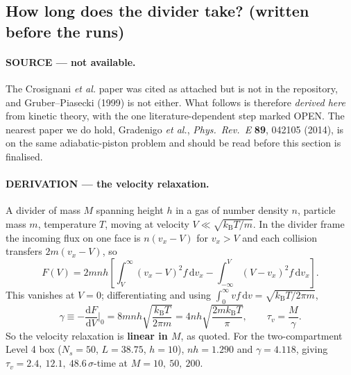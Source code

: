 \documentclass[11pt,a4paper]{article}
\newcommand{\kT}{k_{\mathrm B}T}
\newcommand{\dd}{\mathrm{d}}
\begin{document}
\subsection{How long does the divider take? (written before the runs)}\label{sec:l4tau}

\paragraph{SOURCE --- not available.} The Crosignani \emph{et al.} paper was cited as attached but
is not in the repository, and Gruber--Piasecki (1999) is not either. What follows is therefore
\emph{derived here} from kinetic theory, with the one literature-dependent step marked OPEN. The
nearest paper we do hold, Gradenigo \emph{et al.}, \emph{Phys.\ Rev.\ E} \textbf{89}, 042105 (2014),
is on the same adiabatic-piston problem and should be read before this section is finalised.

\paragraph{DERIVATION --- the velocity relaxation.} A divider of mass $M$ spanning height $h$ in a
gas of number density $n$, particle mass $m$, temperature $T$, moving at velocity $V \ll
\sqrt{\kT/m}$. In the divider frame the incoming flux on one face is $n(v_x - V)$ for $v_x > V$ and
each collision transfers $2m(v_x-V)$, so
\begin{equation}
F(V) = 2mnh\left[\int_V^\infty (v_x-V)^2 f\,\dd v_x - \int_{-\infty}^V (V-v_x)^2 f\,\dd v_x\right].
\end{equation}
This vanishes at $V=0$; differentiating and using $\int_0^\infty v f\,\dd v = \sqrt{\kT/2\pi m}$,
\begin{equation}
\gamma \equiv -\frac{\dd F}{\dd V}\bigg|_0 = 8mnh\sqrt{\frac{\kT}{2\pi m}}
 = 4nh\sqrt{\frac{2m\kT}{\pi}},\qquad \tau_v = \frac{M}{\gamma}.
\label{eq:gamma}
\end{equation}
So the velocity relaxation is \textbf{linear in $M$}, as quoted. For the two-compartment Level 4 box
($N_s = 50$, $L = 38.75$, $h = 10$), $nh = 1.290$ and $\gamma = 4.118$, giving
$\tau_v = 2.4,\ 12.1,\ 48.6\,\sigma$-time at $M = 10,\ 50,\ 200$.
\end{document}
